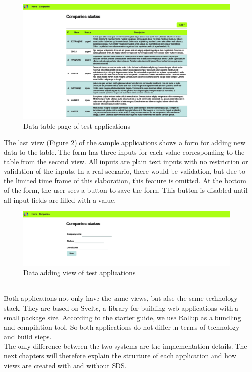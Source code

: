 \begin{figure}[htbp]
    \centerline{\includegraphics[width=\linewidth, draft=false]{images/demo_view_data_table.png}}
    \caption{Data table page of test applications}
    \label{data_table}
    \end{figure}
The last view (Figure \ref{adding_form}) of the sample applications shows a form for adding new data to the table. The form has three inputs for each value corresponding to the table from the second view. All inputs are plain text inputs with no restriction or validation of the inputs. In a real scenario, there would be validation, but due to the limited time frame of this elaboration, this feature is omitted. At the bottom of the form, the user sees a button to save the form. This button is disabled until all input fields are filled with a value. 
\begin{figure}[htbp]
    \centerline{\includegraphics[width=\linewidth, draft=false]{images/demo_view_form.png}}
    \caption{Data adding view of test applications}
    \label{adding_form}
    \end{figure}
\\
Both applications not only have the same views, but also the same technology stack. They are based on Svelte, a library for building web applications with a small package size. According to the starter guide, we use Rollup as a bundling and compilation tool. So both applications do not differ in terms of technology and build steps. \cite{svelte_svelte_nodate} \\
The only difference between the two systems are the implementation details. The next chapters will therefore explain the structure of each application and how views are created with and without SDS.
